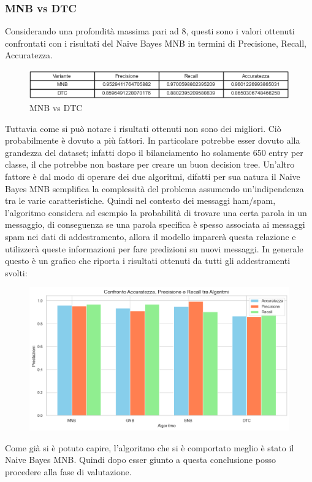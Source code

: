 \documentclass[]{article}
\begin{document}
                    \subsubsection{MNB vs DTC}
                        Considerando una profondità massima pari ad 8, questi sono i valori ottenuti confrontati con i risultati del Naive Bayes MNB in termini di Precisione, Recall, Accuratezza.

                        \begin{figure}[H]
                            \centering
                            \includegraphics[width=1\linewidth]{images/FinalTable.png}
                            \caption{MNB vs DTC}
                            \label{fig:enter-label}
                        \end{figure}

                        Tuttavia come si può notare i risultati ottenuti non sono dei migliori. Ciò probabilmente è dovuto a più fattori. In particolare potrebbe esser dovuto alla grandezza del dataset; infatti dopo il bilanciamento ho solamente 650 entry per classe, il che potrebbe non bastare per creare un buon decision tree. Un'altro fattore è dal modo di operare dei due algoritmi, difatti per sua natura il Naive Bayes MNB semplifica la complessità del problema assumendo un'indipendenza tra le varie caratteristiche. Quindi nel contesto dei messaggi ham/spam, l'algoritmo considera ad esempio la probabilità di trovare una certa parola in un messaggio, di conseguenza se una parola specifica è spesso associata ai messaggi spam nei dati di addestramento, allora il modello imparerà questa relazione e utilizzerà queste informazioni per fare predizioni su nuovi messaggi.
                        In generale questo è un grafico che riporta i risultati ottenuti da tutti gli addestramenti svolti:
                        \begin{figure}[H]
                            \centering
                            \includegraphics[width=1\linewidth]{images/AllResult.png}
                            \label{fig:enter-label}
                        \end{figure}
                        Come già si è potuto capire, l'algoritmo che si è comportato meglio è stato il Naive Bayes MNB. Quindi dopo esser giunto a questa conclusione posso procedere alla fase di valutazione.
        \newpage
\end{document}
